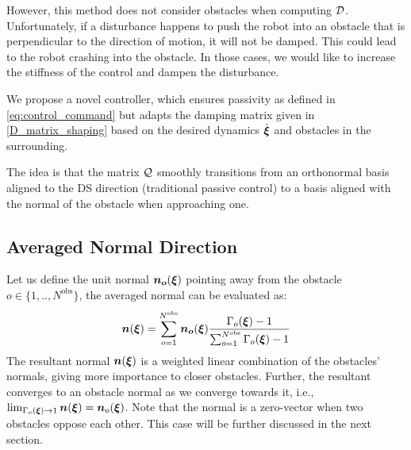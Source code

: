 \documentclass[conference]{IEEEtran}
\begin{document}
However, this method does not consider obstacles when computing $\mathcal{D}$. Unfortunately, if a disturbance happens to push the robot into an obstacle that is perpendicular to the direction of motion, it will not be damped. This could lead to the robot crashing into the obstacle. In those cases, we would like to increase the stiffness of the control and dampen the disturbance.

We propose a novel controller, which ensures passivity as defined in \eqref{eq:control_command} but adapts the damping matrix given in \eqref{D_matrix_shaping} based on the desired dynamics $\dot{\boldsymbol{\xi}}$ and obstacles in the surrounding. 

The idea is that the matrix $\mathcal{Q}$ smoothly transitions from an orthonormal basis aligned to the DS direction (traditional passive control) to a basis aligned with the normal of the obstacle when approaching one.

\subsection{Averaged Normal Direction} \label{sec:obstacle_normals}
Let us define the unit normal $\boldsymbol{n_o} (\boldsymbol{\xi})$  pointing away from the obstacle $o \in \{1,  ..,  N^{\mathrm{obs}} \}$, the averaged normal can be evaluated as:
\begin{equation}
  \boldsymbol{n}(\boldsymbol{\xi}) = \sum_{o=1}^{N^{\mathrm{obs}}} \boldsymbol{n_o}(\boldsymbol{\xi})
  \frac{\Gamma_o(\boldsymbol{\xi}) - 1}{\sum_{o=1}^{N^\mathrm{obs}} \Gamma_o(\boldsymbol{\xi}) - 1}
\end{equation}
The resultant normal $\boldsymbol{n}(\boldsymbol{\xi})$ is a weighted linear combination of the obstacles' normals, giving more importance to closer obstacles.
Further, the resultant converges to an obstacle normal as we converge towards it, i.e., $\lim_{\Gamma_o(\boldsymbol{\xi}) \rightarrow 1} \boldsymbol{n}(\boldsymbol{\xi}) = \boldsymbol{n}_o(\boldsymbol{\xi})$.
Note that the normal is a zero-vector when two obstacles oppose each other. This case will be further discussed in the next section.
\end{document}
